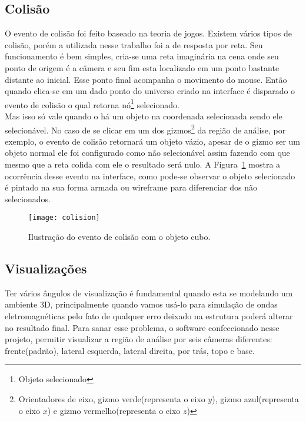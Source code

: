 	\subsection{Colisão}
	O evento de colisão foi feito baseado na teoria de jogos. Existem vários tipos de colisão, porém a utilizada nesse trabalho foi a de resposta por reta. Seu funcionamento é bem simples, cria-se uma reta imaginária na cena onde seu ponto de origem é a câmera e seu fim esta localizado em um ponto bastante distante ao inicial. Esse ponto final acompanha o movimento do mouse. Então quando clica-se em um dado ponto do universo criado na interface é disparado o evento de colisão o qual retorna {nó}\footnote{Objeto selecionado} selecionado. \\
	
	Mas isso só vale quando o há um objeto na coordenada selecionada sendo ele selecionável. No caso de se clicar em um dos gizmos\footnote{Orientadores de eixo, gizmo verde(representa o eixo $y$), gizmo azul(representa o eixo $x$) e gizmo vermelho(representa o eixo $z$)} da região de análise, por exemplo, o evento de colisão retornará um objeto vázio, apesar de o gizmo ser um objeto normal ele foi configurado como não selecionável assim fazendo com que mesmo que a reta colida com ele o resultado será nulo. A Figura~\ref{fg:colision} mostra a ocorrência desse evento na interface, como pode-se observar o objeto selecionado é pintado na sua forma armada ou wireframe para diferenciar dos não selecionados.
	
\begin{figure}[ht!]
	\centering
	\texttt{[image: colision]}
	\caption{Ilustração do evento de colisão com o objeto cubo.}
	\label{fg:colision}
\end{figure}

	\subsection{Visualizações}
	Ter vários ângulos de visualização é fundamental quando esta se modelando um ambiente 3D, principalmente quando vamos usá-lo para simulação de ondas eletromagnéticas pelo fato de qualquer erro deixado na estrutura poderá alterar no resultado final. Para sanar esse problema, o software confeccionado nesse projeto, permitir visualizar a região de análise por seis câmeras diferentes: frente(padrão), lateral esquerda, lateral direita, por trás, topo e base. 
	
